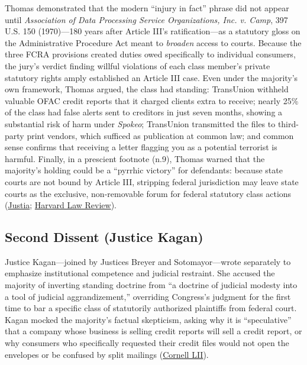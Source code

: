 \documentclass[12pt]{article}
\begin{document}
Thomas demonstrated that the modern ``injury in fact'' phrase did not appear until \textit{Association of Data Processing Service Organizations, Inc. v. Camp}, 397 U.S. 150 (1970)---180 years after Article III's ratification---as a statutory gloss on the Administrative Procedure Act meant to \textit{broaden} access to courts. Because the three FCRA provisions created duties owed specifically to individual consumers, the jury's verdict finding willful violations of each class member's private statutory rights amply established an Article III case. Even under the majority's own framework, Thomas argued, the class had standing: TransUnion withheld valuable OFAC credit reports that it charged clients extra to receive; nearly 25\% of the class had false alerts sent to creditors in just seven months, showing a substantial risk of harm under \textit{Spokeo}; TransUnion transmitted the files to third-party print vendors, which sufficed as publication at common law; and common sense confirms that receiving a letter flagging you as a potential terrorist is harmful. Finally, in a prescient footnote (n.9), Thomas warned that the majority's holding could be a ``pyrrhic victory'' for defendants: because state courts are not bound by Article III, stripping federal jurisdiction may leave state courts as the exclusive, non-removable forum for federal statutory class actions (\href{https://supreme.justia.com/cases/federal/us/594/20-297/}{Justia}; \href{https://harvardlawreview.org/print/vol-135/transunion-v-ramirez/}{Harvard Law Review}).

\subsection{Second Dissent (Justice Kagan)}

Justice Kagan---joined by Justices Breyer and Sotomayor---wrote separately to emphasize institutional competence and judicial restraint. She accused the majority of inverting standing doctrine from ``a doctrine of judicial modesty into a tool of judicial aggrandizement,'' overriding Congress's judgment for the first time to bar a specific class of statutorily authorized plaintiffs from federal court. Kagan mocked the majority's factual skepticism, asking why it is ``speculative'' that a company whose business is selling credit reports will sell a credit report, or why consumers who specifically requested their credit files would not open the envelopes or be confused by split mailings (\href{https://www.law.cornell.edu/supremecourt/text/20-297}{Cornell LII}).
\end{document}
